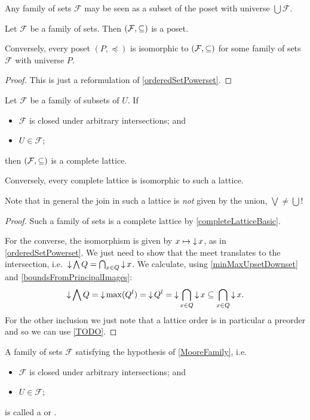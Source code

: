 Any family of sets $\mathcal{F}$ may be seen as a subset of the poset with universe $\bigcup \mathcal{F}$.

\begin{proposition} \label{posetPowerset}
Let $\mathcal{F}$ be a family of sets. Then $\left( \mathcal{F}, \subseteq \right)$ is a poset.

Conversely, every poset $(P,\preceq)$ is isomorphic to $\left( \mathcal{F}, \subseteq \right)$ for some family of sets $\mathcal{F}$ with universe $P$.
\end{proposition}
\begin{proof}
This is just a reformulation of \ref{orderedSetPowerset}.
\end{proof}
\begin{corollary} \label{MooreFamily}
Let $\mathcal{F}$ be a family of subsets of $U$. If
\begin{itemize}
\item $\mathcal{F}$ is closed under arbitrary intersections; and
\item $U \in \mathcal{F}$;
\end{itemize}
then $\left( \mathcal{F},\subseteq \right)$ is a complete lattice.

Conversely, every complete lattice is isomorphic to such a lattice.
\end{corollary}
Note that in general the join in such a lattice is \emph{not} given by the union, $\bigvee \neq \bigcup$!
\begin{proof}
Such a family of sets is a complete lattice by \ref{completeLatticeBasic}.

For the converse, the isomorphism is given by $x\mapsto \operatorname{\downarrow} x$, as in \ref{orderedSetPowerset}. We just need to show that the meet translates to the intersection, i.e.\ $\operatorname{\downarrow} \bigwedge Q = \bigcap_{x\in Q}\operatorname{\downarrow} x$. We calculate, using \ref{minMaxUpsetDownset} and \ref{boundsFromPrincipalImages}:
\[ \operatorname{\downarrow} \bigwedge Q = \operatorname{\downarrow} \max(Q^l) = \operatorname{\downarrow} Q^l = \operatorname{\downarrow} \bigcap_{x\in Q} \operatorname{\downarrow} x \subseteq \bigcap_{x\in Q} \operatorname{\downarrow} x. \]
For the other inclusion we just note that a lattice order is in particular a  preorder and so we can use \ref{TODO}.
\end{proof}

\begin{definition}
A family of sets $\mathcal{F}$ satisfying the hypothesis of \ref{MooreFamily}, i.e.\
\begin{itemize}
\item $\mathcal{F}$ is closed under arbitrary intersections; and
\item $U \in \mathcal{F}$;
\end{itemize}
is called a  or .
\end{definition}

